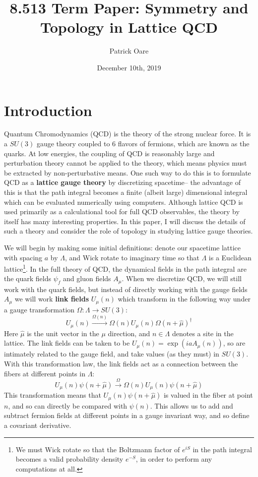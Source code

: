\documentclass[11pt, oneside]{article}   	%
\title{8.513 Term Paper: Symmetry and Topology in Lattice QCD}
\author{Patrick Oare}
\date{December 10th, 2019}							%
\theoremstyle{definition}
\begin{document}
\maketitle
\section{Introduction}

Quantum Chromodynamics (QCD) is the theory of the strong nuclear force. It is a $SU(3)$ gauge theory coupled to 6 flavors of 
fermions, which are known as the quarks. At low energies, the coupling of QCD is reasonably large and perturbation theory cannot 
be applied to the theory, which means physics must be extracted by non-perturbative means. One such way to do this is to formulate 
QCD as a \textbf{lattice gauge theory} by discretizing spacetime-- the advantage of this is that the path integral becomes a finite 
(albeit large) dimensional integral which can be evaluated numerically using computers. Although lattice QCD is used primarily 
as a calculational tool for full QCD observables, the theory by itself has many interesting properties. In this paper, I will discuss 
the details of such a theory and consider the role of topology in studying lattice gauge theories. 

We will begin by making some initial definitions: denote our spacetime lattice with spacing $a$ by $\Lambda$, and Wick rotate to 
imaginary time so that $\Lambda$ is a Euclidean lattice\footnote{We must Wick rotate so that the Boltzmann factor of $e^{iS}$ in the 
path integral becomes a valid probability density $e^{-S}$, in order to perform any computations at all.}. In the full theory 
of QCD, the dynamical fields in the path integral are the quark fields $\psi_f$ and gluon fields $A_\mu$. When we 
discretize QCD, we will still work with the quark fields, but instead of directly working with the gauge fields $A_\mu$ we will work 
\textbf{link fields} $U_\mu(n)$ which transform in the following way under a gauge transformation $\Omega : \Lambda\rightarrow 
SU(3)$:
\begin{equation}
	U_\mu(n)\xrightarrow{\Omega(n)}\Omega(n) U_\mu(n)\Omega(n + \hat{\mu})^\dagger
\end{equation}
Here $\hat{\mu}$ is the unit vector in the $\mu$ direction, and $n\in\Lambda$ denotes a site in the lattice. The link fields can be taken 
to be $U_\mu(n) = \exp(ia A_\mu(n))$, so are intimately related to the gauge field, and take values (as they must) in $SU(3)$. 
With this transformation law, the link fields act as a connection between the fibers at different points in $\Lambda$:
\begin{equation}
	U_\mu(n)\psi(n + \hat{\mu})\xrightarrow{\Omega} \Omega(n) U_\mu(n)\psi(n + \hat{\mu})
\end{equation}
This transformation means that $U_\mu(n)\psi(n + \hat\mu)$ is valued in the fiber at point $n$, and so can directly be compared with 
$\psi(n)$. This allows us to add and subtract fermion fields at different points in a gauge invariant way, and so define a covariant derivative. 
\end{document}
